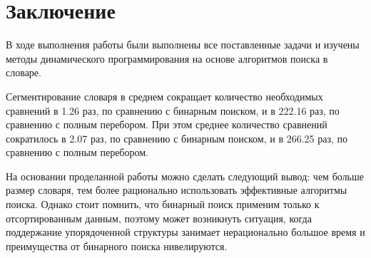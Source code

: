 \chapter*{Заключение}

В ходе выполнения работы были выполнены все поставленные задачи и изучены методы динамического программирования на основе алгоритмов поиска в словаре. 

Сегментирование словаря в среднем сокращает количество необходимых сравнений в 1.26 раз, по сравнению с бинарным поиском, и в 222.16 раз, по сравнению с полным перебором. При этом среднее количество сравнений сократилось в 2.07 раз, по сравнению с бинарным поиском, и в 266.25 раз, по сравнению с полным перебором.

На основании проделанной работы можно сделать следующий вывод:
чем больше размер словаря, тем более рационально использовать
эффективные алгоритмы поиска. Однако стоит помнить, что бинарный
поиск применим только к отсортированным данным, поэтому может возникнуть
ситуация, когда поддержание упорядоченной структуры занимает
нерационально большое время и преимущества от бинарного поиска
нивелируются.
